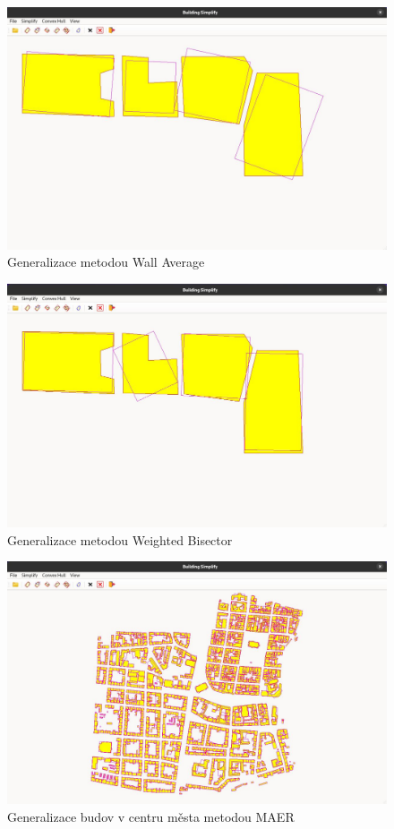 \begin{figure}[H]
    \centering
    \includegraphics[width=\textwidth]{images/Ukazaka_wa.JPG}
    \caption{Generalizace metodou Wall Average}
\end{figure}

\begin{figure}[H]
    \centering
    \includegraphics[width=\textwidth]{images/Ukazaka_wb.JPG}
    \caption{Generalizace metodou Weighted Bisector}
\end{figure}

\begin{figure}[H]
    \centering
    \includegraphics[width=\textwidth]{images/Ukazaka_city_centre.JPG}
    \caption{Generalizace budov v centru města metodou MAER}
\end{figure}


